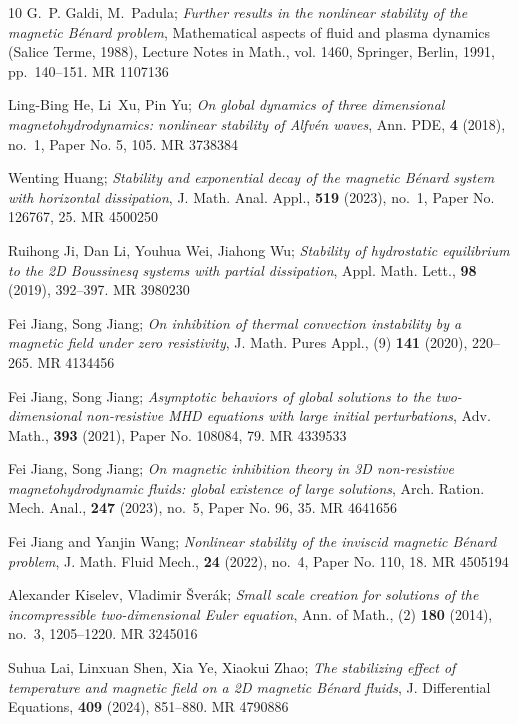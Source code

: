 \documentclass[reqno]{amsart}
\begin{document}
\begin{thebibliography}{10}
G.~P. Galdi, M.~Padula; 
\emph{Further results in the nonlinear stability of
 the magnetic {B}\'enard problem}, Mathematical aspects of fluid and plasma
 dynamics ({S}alice {T}erme, 1988), Lecture Notes in Math., vol. 1460,
 Springer, Berlin, 1991, pp.~140--151. MR {1107136}

Ling-Bing He, Li~Xu, Pin Yu; 
\emph{On global dynamics of three dimensional
 magnetohydrodynamics: nonlinear stability of {A}lfv\'en waves}, Ann. PDE,
 \textbf{4} (2018), no.~1, Paper No. 5, 105. MR {3738384}

Wenting Huang; 
\emph{Stability and exponential decay of the magnetic
 {B}\'enard system with horizontal dissipation}, J. Math. Anal. Appl.,
 \textbf{519} (2023), no.~1, Paper No. 126767, 25. MR {4500250}

Ruihong Ji, Dan Li, Youhua Wei,  Jiahong Wu; 
\emph{Stability of hydrostatic
 equilibrium to the 2{D} {B}oussinesq systems with partial dissipation}, Appl.
 Math. Lett., \textbf{98} (2019), 392--397. MR {3980230}

Fei Jiang, Song Jiang; 
\emph{On inhibition of thermal convection instability
 by a magnetic field under zero resistivity}, J. Math. Pures Appl., (9)
 \textbf{141} (2020), 220--265. MR {4134456}

Fei Jiang, Song Jiang; 
\emph{Asymptotic behaviors of global solutions to the two-dimensional
 non-resistive {MHD} equations with large initial perturbations}, Adv. Math.,
 \textbf{393} (2021), Paper No. 108084, 79. MR {4339533}

Fei Jiang, Song Jiang; 
\emph{On magnetic inhibition theory in 3{D} non-resistive
 magnetohydrodynamic fluids: global existence of large solutions}, Arch.
 Ration. Mech. Anal., \textbf{247} (2023), no.~5, Paper No. 96, 35.
 MR {4641656}

Fei Jiang and Yanjin Wang; 
\emph{Nonlinear stability of the inviscid magnetic
 {B}\'enard problem}, J. Math. Fluid Mech., \textbf{24} (2022), no.~4, Paper
 No. 110, 18. MR {4505194}

Alexander Kiselev, Vladimir \v{S}ver\'{a}k; 
\emph{Small scale creation for  solutions of the incompressible two-dimensional 
{E}uler equation}, Ann. of  Math., (2) \textbf{180} (2014), no.~3, 1205--1220. MR {3245016}

Suhua Lai, Linxuan Shen, Xia Ye, Xiaokui Zhao; 
\emph{The stabilizing effect  of temperature and magnetic field on a 2{D} 
magnetic {B}\'enard fluids}, J.
 Differential Equations, \textbf{409} (2024), 851--880. MR {4790886}


\end{thebibliography}
\end{document}
